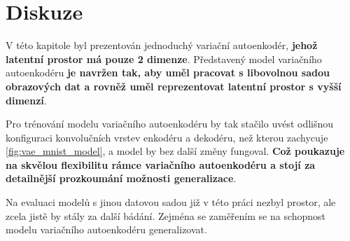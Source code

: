 \section{Diskuze}
\label{sec:vae_model_discussion}
V této kapitole byl prezentován jednoduchý variační autoenkodér, \textbf{jehož latentní prostor má pouze 2 dimenze}.
Představený model variačního autoenkodéru \textbf{je navržen tak, aby uměl pracovat s libovolnou sadou obrazových dat a rovněž uměl reprezentovat latentní prostor s vyšší dimenzí}.

Pro trénování modelu variačního autoenkodéru by tak stačilo uvést odlišnou konfiguraci konvolučních vrstev enkodéru a dekodéru, než kterou zachycuje \autoref{fig:vae_mnist_model}, a model by bez další změny fungoval.
\textbf{Což poukazuje na skvělou flexibilitu rámce variačního autoenkodéru a stojí za detailnější prozkoumání možnosti generalizace}.

Na evaluaci modelů s jinou datovou sadou již v této práci nezbyl prostor, ale zcela jistě by stály za další bádání. Zejména se zaměřením se na schopnost modelu variačního autoenkodéru generalizovat.

